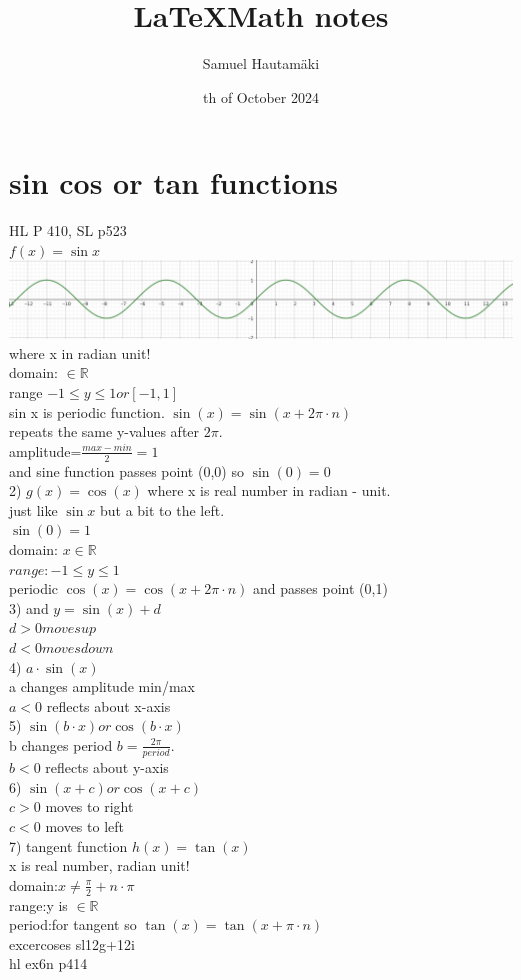 \documentclass{article}
\title{\LaTeX Math notes}
\author{Samuel Hautamäki}
\date{th of October 2024}
\begin{document}
  \maketitle
   
  \section{sin cos or tan functions}
  HL P 410, SL p523\\
  $f(x)=\sin x$\\
  \includegraphics {sinewave}
  where x in radian unit!\\
  domain: $\in\mathbb{R}$\\
  range $-1\leq y\leq 1 or [-1,1]$\\
  sin x is periodic function. $\sin(x)=\sin(x+2\pi\cdot n)$\\
  repeats the same y-values after $2\pi$.\\
  amplitude=$\frac{max-min}{2}=1$\\
  and sine function passes point (0,0) so $\sin(0)=0$\\
  2) $g(x)=\cos(x)$ where x is real number in radian - unit.\\
  just like $\sin x$ but a bit to the left.\\
  $\sin(0)=1$\\
  domain: $x\in\mathbb{R}$\\
  $range: -1\leq y\leq 1$\\
  periodic $\cos(x)=\cos(x+2\pi\cdot n)$ and passes point (0,1)\\
  3) and $y=\sin(x)+d$\\
  $d>0 moves up$\\
  $d<0 moves down$\\
  4) $a\cdot \sin(x)$\\
  a changes amplitude min/max\\
  $a<0$ reflects about x-axis\\
  5) $\sin(b\cdot x) or \cos(b\cdot x)$\\
  b changes period $b=\frac{2\pi}{period}$.\\
  $b<0$ reflects about y-axis\\
  6) $\sin(x+c) or \cos(x+c)$\\
  $c>0$ moves to right\\
  $c<0$ moves to left\\
  7) tangent function $h(x)=\tan(x)$\\
  x is real number, radian unit!\\
  domain:$x\neq\frac{\pi}{2}+n\cdot\pi$\\
  range:y is $\in\mathbb{R}$\\
  period:\pi for tangent so $\tan(x)=\tan(x+\pi\cdot n)$\\
  excercoses sl12g+12i\\
  hl ex6n p414\\
\end{document}
